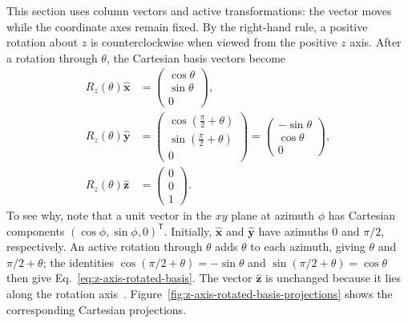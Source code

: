 This section uses column vectors and active transformations: the vector moves
while the coordinate axes remain fixed.  By the right-hand rule, a positive
rotation about $z$ is counterclockwise when viewed from the positive $z$ axis.
After a rotation through $\theta$, the Cartesian basis vectors become
\begin{equation}
    \begin{aligned}
        R_z(\theta)\hat{\mathbf{x}}
         & =\begin{pmatrix}\cos\theta\\ \sin\theta\\ 0\end{pmatrix}, \\
        R_z(\theta)\hat{\mathbf{y}}
         & =\begin{pmatrix}\cos(\frac{\pi}{2}+\theta) \\
                \sin(\frac{\pi}{2}+\theta) \\0\end{pmatrix}
        =\begin{pmatrix}-\sin\theta\\ \cos\theta\\0\end{pmatrix},    \\
        R_z(\theta)\hat{\mathbf{z}}
         & =\begin{pmatrix}0\\0\\1\end{pmatrix}.
    \end{aligned}
    \label{eq:z-axis-rotated-basis}
\end{equation}
To see why, note that a unit vector in the $xy$ plane at azimuth $\phi$ has
Cartesian components $(\cos\phi,\sin\phi,0)^{\mathsf T}$.  Initially,
$\hat{\mathbf{x}}$ and $\hat{\mathbf{y}}$ have azimuths $0$ and $\pi/2$,
respectively.  An active rotation through $\theta$ adds $\theta$ to each
azimuth, giving $\theta$ and $\pi/2+\theta$; the identities
$\cos(\pi/2+\theta)=-\sin\theta$ and
$\sin(\pi/2+\theta)=\cos\theta$ then give
Eq.~\eqref{eq:z-axis-rotated-basis}.  The vector $\hat{\mathbf{z}}$ is
unchanged because it lies along the rotation axis~\cite{ee237-week11}.
Figure~\ref{fig:z-axis-rotated-basis-projections} shows the corresponding
Cartesian projections.

